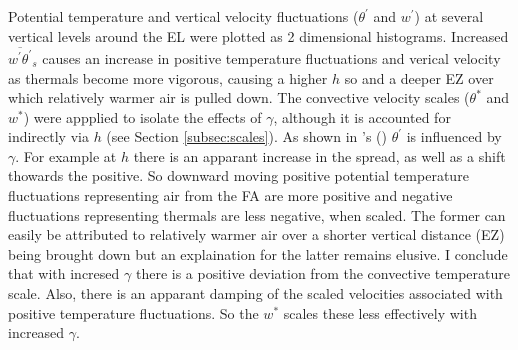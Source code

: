 Potential temperature and vertical velocity fluctuations ($\theta^{'}$ and $w^{'}$) at several vertical levels around the \acs{EL} were plotted as 2 dimensional histograms.  Increased $\overline{w^{'}\theta^{'}}_{s}$ causes an increase in positive temperature fluctuations and verical velocity as thermals become more vigorous, causing a higher $h$ so and a deeper \acs{EZ} over which relatively warmer air is pulled down.  The convective velocity scales ($\theta^{*}$ and $w^{*}$) were appplied to isolate the effects of $\gamma$, although it is accounted for indirectly via $h$ (see Section \ref{subsec:scales}). As shown in \citeauthor{Sorbjan}'s (\citeyear{Sorbjan}) $\theta^{'}$ is influenced  by $\gamma$.  For example at $h$ there is an apparant increase in the spread, as well as a shift thowards the positive.  So downward moving positive potential temperature fluctuations representing air from the \acs{FA} are more positive and negative fluctuations representing thermals are less negative, when scaled.  The former can easily be attributed to relatively warmer air over a shorter vertical distance (\acs{EZ}) being brought down but an explaination for the latter remains elusive.  I conclude that with incresed $\gamma$ there is a positive deviation from the convective temperature scale.  Also, there is an apparant damping of the scaled velocities associated with positive temperature fluctuations.  So the $w^{*}$ scales these less effectively with increased $\gamma$.  \\



